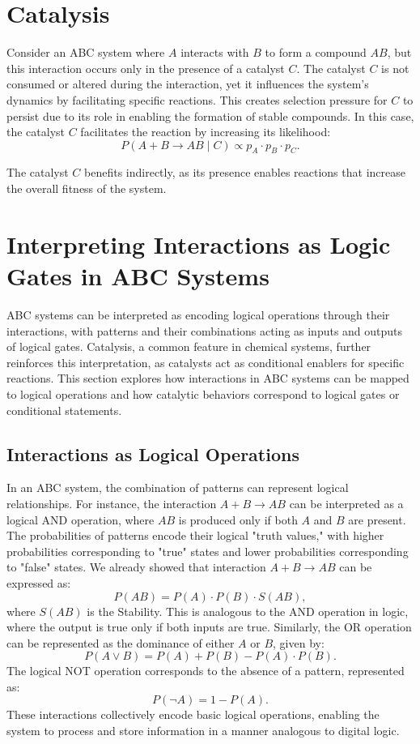 \documentclass[entropy,article,submit,pdftex,moreauthors]{Definitions/mdpi}
\begin{document}
\section{Catalysis}

Consider an ABC system where \( A \) interacts with \( B \) to form a compound \( AB \), but this interaction occurs only in the presence of a catalyst \( C \). The catalyst \( C \) is not consumed or altered during the interaction, yet it influences the system's dynamics by facilitating specific reactions. This creates selection pressure for \( C \) to persist due to its role in enabling the formation of stable compounds. In this case, the catalyst \( C \) facilitates the reaction by increasing its likelihood:
\[
P(A + B \to AB \mid C) \propto p_A \cdot p_B \cdot p_C.
\]

The catalyst \( C \) benefits indirectly, as its presence enables reactions that increase the overall fitness of the system.

\section{Interpreting Interactions as Logic Gates in ABC Systems}

ABC systems can be interpreted as encoding logical operations through their interactions, with patterns and their combinations acting as inputs and outputs of logical gates. Catalysis, a common feature in chemical systems, further reinforces this interpretation, as catalysts act as conditional enablers for specific reactions. This section explores how interactions in ABC systems can be mapped to logical operations and how catalytic behaviors correspond to logical gates or conditional statements.

\subsection{Interactions as Logical Operations}

In an ABC system, the combination of patterns can represent logical relationships. For instance, the interaction \( A + B \to AB \) can be interpreted as a logical AND operation, where \( AB \) is produced only if both \( A \) and \( B \) are present. The probabilities of patterns encode their logical "truth values," with higher probabilities corresponding to "true" states and lower probabilities corresponding to "false" states. We already showed that interaction \( A + B \to AB \) can be expressed as:
\[
P(AB) = P(A) \cdot P(B) \cdot S(AB),
\]
where \( S(AB) \) is the Stability. This is analogous to the AND operation in logic, where the output is true only if both inputs are true. Similarly, the OR operation can be represented as the dominance of either \( A \) or \( B \), given by:
\[
P(A \lor B) = P(A) + P(B) - P(A) \cdot P(B).
\]
The logical NOT operation corresponds to the absence of a pattern, represented as:
\[
P(\neg A) = 1 - P(A).
\]
These interactions collectively encode basic logical operations, enabling the system to process and store information in a manner analogous to digital logic.
\end{document}
